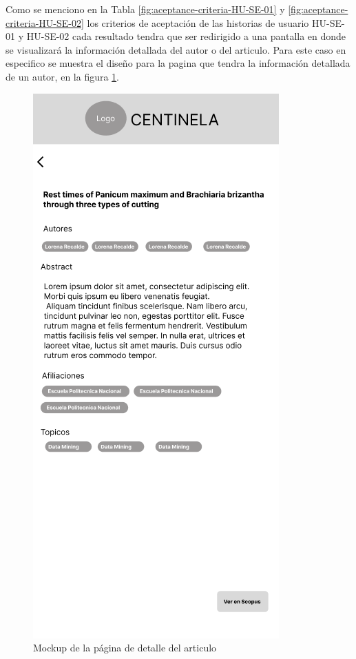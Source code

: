 Como se menciono en la Tabla \ref{fig:aceptance-criteria-HU-SE-01} y \ref{fig:aceptance-criteria-HU-SE-02} los criterios de aceptación de las historias de usuario HU-SE-01 y HU-SE-02 cada resultado tendra que ser redirigido a una pantalla en donde 
se visualizará la información detallada del autor o del articulo. Para este caso en especifico se muestra el diseño para la pagina que tendra
la información detallada de un autor, en la figura \ref{fig:mockup-article-detail}.
\begin{figure}[H]
    \centering
    \includegraphics[scale=0.8]{../02Figures/02Chapter/Sprints/Sprint-1/article-detail.png}
    \caption{Mockup de la página de detalle del articulo}
    \label{fig:mockup-article-detail}
\end{figure}

